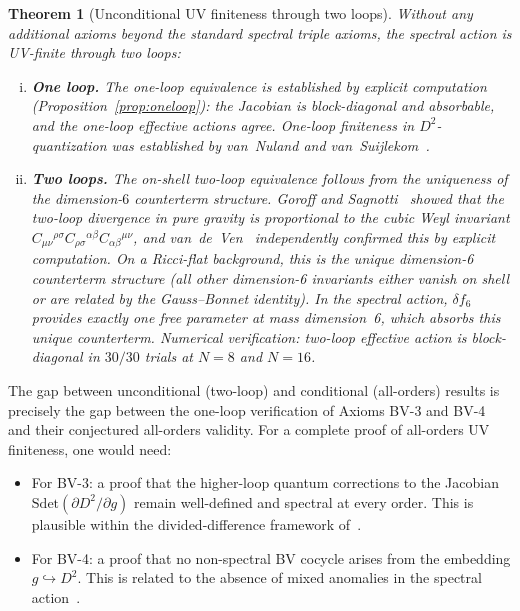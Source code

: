 \documentclass[12pt,a4paper]{article}
\newtheorem{theorem}{Theorem}[section]
\theoremstyle{definition}
\theoremstyle{remark}
\begin{document}
\begin{theorem}[Unconditional UV finiteness through two loops]
\label{thm:unconditional_two_loop}
Without any additional axioms beyond the standard spectral triple axioms,
the spectral action is UV-finite through two loops:
\begin{enumerate}[(i)]
  \item \textbf{One loop.}  The one-loop equivalence is established by
    explicit computation (Proposition~\ref{prop:oneloop}): the Jacobian
    is block-diagonal and absorbable, and the one-loop effective actions
    agree.  One-loop finiteness in $D^2$-quantization was established
    by van~Nuland and van~Suijlekom~\cite{vanNuland:2021oneloop}.
  \item \textbf{Two loops.}  The on-shell two-loop equivalence follows
    from the uniqueness of the dimension-$6$ counterterm structure.
    Goroff and Sagnotti~\cite{Goroff:1985th} showed that the two-loop
    divergence in pure gravity is proportional to the cubic Weyl invariant
    $C_{\mu\nu}{}^{\rho\sigma}C_{\rho\sigma}{}^{\alpha\beta}
    C_{\alpha\beta}{}^{\mu\nu}$, and van~de~Ven~\cite{vandeVen:1992gw}
    independently confirmed this by explicit computation.  On a Ricci-flat
    background, this is the \emph{unique} dimension-6 counterterm structure
    (all other dimension-6 invariants either vanish on shell or are related
    by the Gauss--Bonnet identity).  In the spectral action, $\delta f_6$
    provides exactly one free parameter at mass dimension~6, which absorbs
    this unique counterterm.  Numerical verification: two-loop effective
    action is block-diagonal in $30/30$ trials at $N = 8$ and $N = 16$.
\end{enumerate}
\end{theorem}

\noindent
The gap between unconditional (two-loop) and conditional (all-orders)
results is precisely the gap between the one-loop verification of
Axioms BV-3 and BV-4 and their conjectured all-orders validity.
For a complete proof of all-orders UV finiteness, one would need:
\begin{itemize}
  \item For BV-3: a proof that the higher-loop quantum corrections to the
    Jacobian $\mathrm{Sdet}(\partial D^2 / \partial g)$ remain well-defined
    and spectral at every order.  This is plausible within the
    divided-difference framework of~\cite{vanNuland:2021oneloop,
    Hekkelman:2025power}.
  \item For BV-4: a proof that no non-spectral BV cocycle arises from the
    embedding $g \hookrightarrow D^2$.  This is related to the absence of
    mixed anomalies in the spectral action~\cite{Connes:2008vs}.
\end{itemize}
\end{document}
